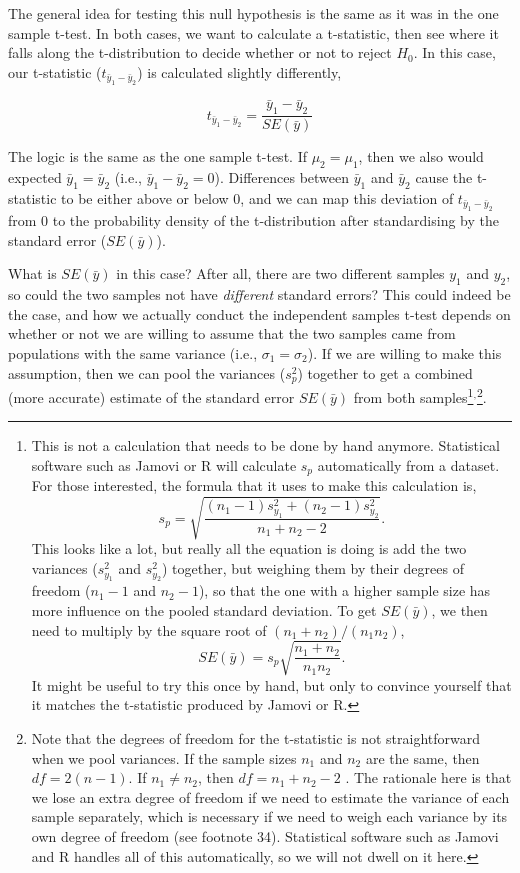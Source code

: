 \documentclass[
]{scrbook}
\begin{document}
The general idea for testing this null hypothesis is the same as it was in the one sample t-test.
In both cases, we want to calculate a t-statistic, then see where it falls along the t-distribution to decide whether or not to reject \(H_{0}\).
In this case, our t-statistic (\(t_{\bar{y}_{1} - \bar{y}_{2}}\)) is calculated slightly differently,

\[t_{\bar{y}_{1} - \bar{y}_{2}} = \frac{\bar{y}_{1} - \bar{y}_{2}}{SE(\bar{y})}\]

The logic is the same as the one sample t-test.
If \(\mu_{2} = \mu_{1}\), then we also would expected \(\bar{y}_{1} = \bar{y}_{2}\) (i.e., \(\bar{y}_{1} - \bar{y}_{2} = 0\)).
Differences between \(\bar{y}_{1}\) and \(\bar{y}_{2}\) cause the t-statistic to be either above or below 0, and we can map this deviation of \(t_{\bar{y}_{1} - \bar{y}_{2}}\) from 0 to the probability density of the t-distribution after standardising by the standard error (\(SE(\bar{y})\)).

What is \(SE(\bar{y})\) in this case?
After all, there are two different samples \(y_{1}\) and \(y_{2}\), so could the two samples not have \emph{different} standard errors?
This could indeed be the case, and how we actually conduct the independent samples t-test depends on whether or not we are willing to assume that the two samples came from populations with the same variance (i.e., \(\sigma_{1} = \sigma_{2}\)).
If we are willing to make this assumption, then we can pool the variances (\(s^{2}_{p}\)) together to get a combined (more accurate) estimate of the standard error \(SE(\bar{y})\) from both samples\footnote{This is not a calculation that needs to be done by hand anymore. Statistical software such as Jamovi or R will calculate \(s_{p}\) automatically from a dataset. For those interested, the formula that it uses to make this calculation is, \[s_{p} = \sqrt{\frac{\left(n_{1} - 1 \right) s^{2}_{y_{1}} + \left(n_{2} - 1 \right) s^{2}_{y_{2}}}{n_{1} + n_{2} - 2}}.\] This looks like a lot, but really all the equation is doing is add the two variances (\(s^{2}_{y_{1}}\) and \(s^{2}_{y_{2}}\)) together, but weighing them by their degrees of freedom (\(n_{1} - 1\) and \(n_{2} - 1\)), so that the one with a higher sample size has more influence on the pooled standard deviation. To get \(SE(\bar{y})\), we then need to multiply by the square root of \((n_{1} + n_{2})/(n_{1}n_{2})\), \[SE(\bar{y}) = s_{p}\sqrt{\frac{n_{1} + n_{2}}{n_{1}n_{2}}}.\] It might be useful to try this once by hand, but only to convince yourself that it matches the t-statistic produced by Jamovi or R.}\(^{,}\)\footnote{Note that the degrees of freedom for the t-statistic is not straightforward when we pool variances. If the sample sizes \(n_{1}\) and \(n_{2}\) are the same, then \(df = 2(n - 1)\). If \(n_{1} \neq n_{2}\), then \(df = n_{1} + n_{2} - 2\) \citep{Sokal1995}. The rationale here is that we lose an extra degree of freedom if we need to estimate the variance of each sample separately, which is necessary if we need to weigh each variance by its own degree of freedom (see footnote 34). Statistical software such as Jamovi and R handles all of this automatically, so we will not dwell on it here.}.
\end{document}
